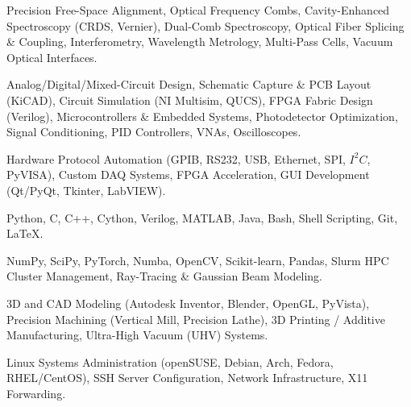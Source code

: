 \documentclass[a4paper,9pt]{extarticle}
\begin{document}
	\begin{description}[font=\bfseries, leftmargin=0pt, labelsep=0.5em, itemsep=0.4em]
		\item[Optics \& Photonics:] Precision Free-Space Alignment, Optical Frequency Combs, Cavity-Enhanced Spectroscopy (CRDS, Vernier), Dual-Comb Spectroscopy, Optical Fiber Splicing \& Coupling, Interferometry, Wavelength Metrology, Multi-Pass Cells, Vacuum Optical Interfaces.
		
		\item[Hardware, EDA \& Electronics:] Analog/Digital/Mixed-Circuit Design, Schematic Capture \& PCB Layout (KiCAD), Circuit Simulation (NI Multisim, QUCS), FPGA Fabric Design (Verilog), Microcontrollers \& Embedded Systems, Photodetector Optimization, Signal Conditioning, PID Controllers, VNAs, Oscilloscopes.
		
		\item[Instrumentation \& DAQ:] Hardware Protocol Automation (GPIB, RS232, USB, Ethernet, SPI, $I^2C$, PyVISA), Custom DAQ Systems, FPGA Acceleration, GUI Development (Qt/PyQt, Tkinter, LabVIEW).
		
		\item[Programming Languages:] Python, C, C++, Cython, Verilog, MATLAB, Java, Bash, Shell Scripting, Git, \LaTeX.
		
		\item[Scientific Computing \& Modeling:] NumPy, SciPy, PyTorch, Numba, OpenCV, Scikit-learn, Pandas, Slurm HPC Cluster Management, Ray-Tracing \& Gaussian Beam Modeling.
		
		\item[Mechanical:] 3D and CAD Modeling (Autodesk Inventor, Blender, OpenGL, PyVista), Precision Machining (Vertical Mill, Precision Lathe), 3D Printing / Additive Manufacturing, Ultra-High Vacuum (UHV) Systems.
		
		\item[Systems \& Infrastructure:] Linux Systems Administration (openSUSE, Debian, Arch, Fedora, RHEL/CentOS), SSH Server Configuration, Network Infrastructure, X11 Forwarding.
	\end{description}
	
\end{document}
